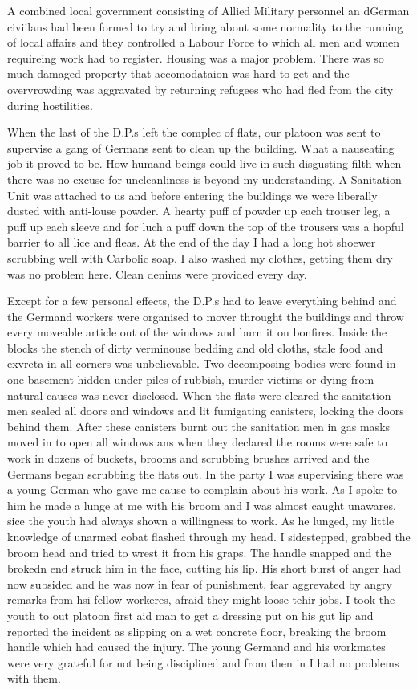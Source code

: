 A combined local government consisting of Allied Military personnel an
dGerman civiilans had been formed to try and bring about some
normality to the running of local affairs and they controlled a Labour
Force to which all men and women requireing work had to
register. Housing was a major problem. There was so much damaged
property that accomodataion was hard to get and the overvrowding was
aggravated by returning refugees who had fled from the city during
hostilities.

When the last of the D.P.s left the complec of flats, our platoon was
sent to supervise a gang of Germans sent to clean up the
building. What a nauseating job it proved to be. How humand beings
could live in such disgusting filth when there was no excuse for
uncleanliness is beyond my understanding. A Sanitation Unit was
attached to us and before entering the buildings we were liberally
dusted with anti-louse powder. A hearty puff of powder up each trouser
leg, a puff up each sleeve and for luch a puff down the top of the
trousers was a hopful barrier to all lice and fleas. At the end of the
day I had a long hot shoewer scrubbing well with Carbolic soap. I also
washed my clothes, getting them dry was no problem here. Clean denims
were provided every day.

Except for a few personal effects, the D.P.s had to leave everything
behind and the Germand workers were organised to mover throught the
buildings and throw every moveable article out of the windows and burn
it on bonfires. Inside the blocks the stench of dirty verminouse
bedding and old cloths, stale food and exvreta in all corners was
unbelievable. Two decomposing bodies were found in one basement hidden
under piles of rubbish, murder victims or dying from natural causes
was never disclosed. When the flats were cleared the sanitation men
sealed all doors and windows and lit fumigating canisters, locking the
doors behind them. After these canisters burnt out the sanitation men
in gas masks moved in to open all windows ans when they declared the
rooms were safe to work in dozens of buckets, brooms and scrubbing
brushes arrived and the Germans began scrubbing the flats out. In the
party I was supervising there was a young German who gave me cause to
complain about his work. As I spoke to him he made a lunge at me with
his broom and I was almost caught unawares, sice the youth had always
shown a willingness to work. As he lunged, my little knowledge of
unarmed cobat flashed through my head. I sidestepped, grabbed the
broom head and tried to wrest it from his graps. The handle snapped
and the brokedn end struck him in the face, cutting his lip. His short
burst of anger had now subsided and he was now in fear of punishment,
fear aggrevated by angry remarks from hsi fellow workeres, afraid they
might loose tehir jobs. I took the youth to out platoon first aid man
to get a dressing put on his gut lip and reported the incident as
slipping on a wet concrete floor, breaking the broom handle which had
caused the injury. The young Germand and his workmates were very
grateful for not being disciplined and from then in I had no problems
with them.

